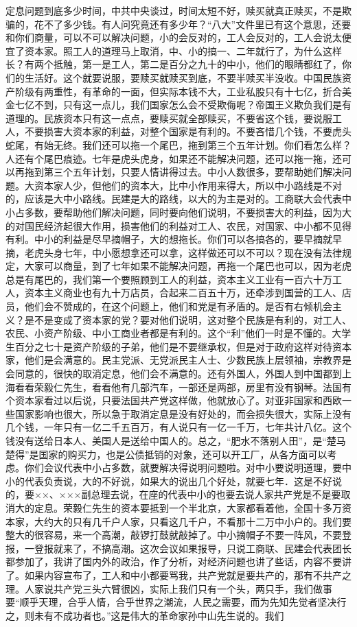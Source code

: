 定息问题到底多少时间，中共中央谈过，时间太短不好，赎买就真正赎买，不是欺骗的，花不了多少钱。有人问究竟还有多少年？“八大”文件里已有这个意思，还要和你们商量，可以不可以解决问题，小的会反对的，工人会反对的，工人会说太便宜了资本家。照工人的道理马上取消，中、小的搞一、二年就行了，为什么这样长？有两个抵触，第一是工人，第二是百分之九十的中小，他们的眼睛都红了，你们的生活好。这个就要说服，要赎买就赎买到底，不要半赎买半没收。中国民族资产阶级有两重性，有革命的一面，但实际本钱不大，工业私股只有十七亿，折合美金七亿不到，只有这一点儿，我们国家怎么会不受欺侮呢？帝国王义欺负我们是有道理的。民族资本只有这一点点，要赎买就全部赎买，不要省这个钱，要说服工人，不要损害大资本家的利益，对整个国家是有利的。不要吝惜几个钱，不要虎头蛇尾，有始无终。我们还可以拖一个尾巴，拖到第三个五年计划。你们看怎么样？人还有个尾巴痕迹。七年是虎头虎身，如果还不能解决问题，还可以拖一拖，还可以再拖到第三个五年计划，只要人情讲得过去。中小人数很多，要帮助她们解决问题。大资本家人少，但他们的资本大，比中小作用来得大，所以中小路线是不对的，应该是大中小路线。民建是大的路线，以大的为主是对的。工商联大会代表中小占多数，要帮助他们解决问题，同时要向他们说明，不要损害大的利益，因为大的对国民经济起很大作用，损害他们的利益对工人、农民，对国家、中小都不见得有利。中小的利益是尽早摘帽子，大的想拖长。你们可以各搞各的，要早摘就早摘，老虎头身七年，中小愿想拿还可以拿，这样做还可以不可以？现在没有法律规定，大家可以商量，到了七年如果不能解决问题，再拖一个尾巴也可以，因为老虎总是有尾巴的，我们第一个要照顾到工人的利益，资本主义工业有一百六十万工人，资本主义商业也有九十万店员，合起来二百五十万，还牵涉到国营的工人、店员，他们会不赞成的，在这个问题上，他们和党是有矛盾的。是否有右倾机会主义？是不是变成了资本家的党？要对他们说明，这对整个民族是有利的，对工人、农民、小资产阶级、中小工商业者都是有利的。这个“利”他们一时是不懂的。大学生百分之七十是资产阶级的子弟，他们是不要继承权，但是对于政府这样对待资本家，他们是会满意的。民主党派、无党派民主人士、少数民族上层领袖，宗教界是会同意的，很快的取消定息，他们会不满意的。还有外国人，外国人到中国都到上海看看荣毅仁先生，看看他有几部汽车，一部还是两部，房里有没有钢琴。法国有个资本家看过以后说，只要法国共产党这样做，他就放心了。对亚非国家和西欧一些国家影响也很大，所以急于取消定息是没有好处的，而会损失很大，实际上没有几个钱，一年只有一亿二千五百万，有人说只有一亿一千万，七年共计八亿。这个钱没有送给日本人、美国人是送给中国人的。总之，“肥水不落别人田”，是“楚马楚得”是国家的购买力，也是公债抵销的对象，还可以开工厂，从各方面可以考虑。你们会议代表中小占多数，就要解决得说明问题啦。对中小要说明道理，要中小的代表负责说，大的不好说，如果大的说出几个好处，就要七年．这是不好说的，要××、×××副总理去说，在座的代表中小的也要去说人家共产党是不是要取消大的定息。荣毅仁先生的资本要抵到一个半北京，大家都看着他，全国十多万资本家，大约大的只有几千户人家，只看这几千户，不看那十二万中小户的。我们要整大的很容易，来一个高潮，敲锣打鼓就敲掉了。中小摘帽子不要一阵风，不要登报，一登报就来了，不搞高潮。这次会议如果报导，只说工商联、民建会代表团长都参加了，我讲了国内外的政治，作了分析，对经济问题也讲了些话，内容不要讲了。如果内容宣布了，工人和中小都要骂我，共产党就是要共产的，那有不共产之理。人家说共产党三头六臂很凶，实际上我们只有一个头，两只手，我们做事要“顺乎天理，合乎人情，合乎世界之潮流，人民之需要，而为先知先觉者坚决行之，则未有不成功者也。”这是伟大的革命家孙中山先生说的。我们